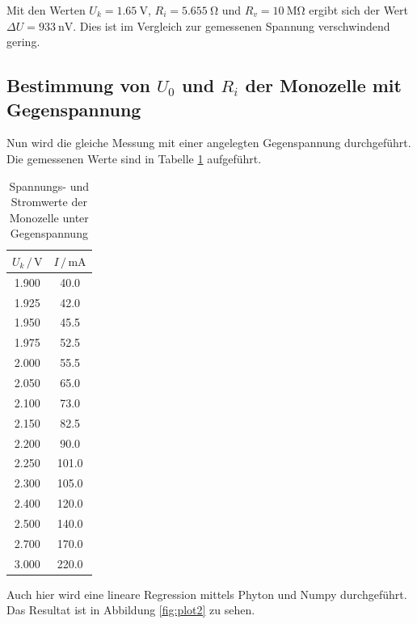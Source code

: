 Mit den Werten $U_k = \SI{1.65}{\volt}$, $R_i = \SI{5.655}{\ohm}$ und 
$R_v = \SI{10}{\mega\ohm}$ ergibt sich der Wert $\Delta U = \SI{933}{\nano\volt}$.
Dies ist im Vergleich zur gemessenen Spannung verschwindend gering.

\subsection{Bestimmung von $U_0$ und $R_i$ der Monozelle mit Gegenspannung}

Nun wird die gleiche Messung mit einer angelegten Gegenspannung durchgeführt.
Die gemessenen Werte sind in Tabelle \ref{tab:Gegen} aufgeführt.

\begin{table}
  \centering
  \caption{Spannungs- und Stromwerte der Monozelle unter Gegenspannung}
  \label{tab:Gegen}
  \begin{tabular}{c c}
    \toprule
     $U_k \,/\, \si{\volt}$ & $I \,/\, \si{\milli\ampere}$\\
    \midrule
      1.900 &  40.0\\
      1.925 &  42.0\\
      1.950 &  45.5\\
      1.975 &  52.5\\
      2.000 &  55.5\\
      2.050 &  65.0\\
      2.100 &  73.0\\
      2.150 &  82.5\\
      2.200 &  90.0\\
      2.250 & 101.0\\
      2.300 & 105.0\\
      2.400 & 120.0\\
      2.500 & 140.0\\
      2.700 & 170.0\\
      3.000 & 220.0\\
    \bottomrule
  \end{tabular}
\end{table}

Auch hier wird eine lineare Regression mittels Phyton und Numpy durchgeführt.
Das Resultat ist in Abbildung \ref{fig:plot2} zu sehen.

